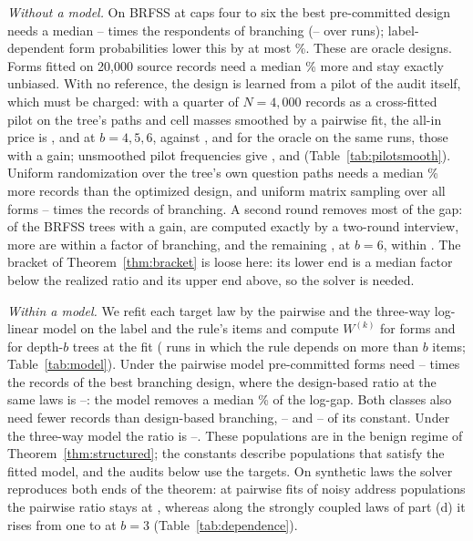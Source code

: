 \emph{Without a model.} On BRFSS at caps four to six the best pre-committed design needs a median \nScreenBestLo--\nScreenBestHi{} times the respondents of branching (\nScreenRunLo--\nScreenRunHi{} over runs); label-dependent form probabilities lower this by at most \nLabelMax\%. These are oracle designs. Forms fitted on 20,000 source records need a median \nFitMed\% more and stay exactly unbiased. With no reference, the design is learned from a pilot of the audit itself, which must be charged: with a quarter of $N=4{,}000$ records as a cross-fitted pilot on the tree's paths and cell masses smoothed by a pairwise fit, the all-in price is \nSmoothFourc, \nSmoothFivec{} and \nSmoothSixc{} at $b=4,5,6$, against \nSmoothFourBest, \nSmoothFiveBest{} and \nSmoothSixBest{} for the oracle on the same runs, those with a gain; unsmoothed pilot frequencies give \nSmoothEmpFourc, \nSmoothEmpFivec{} and \nSmoothEmpSixc{} (Table~\ref{tab:pilotsmooth}). Uniform randomization over the tree's own question paths needs a median \nUpsOverMed\% more records than the optimized design, and uniform matrix sampling over all forms \nUnifLo--\nUnifHi{} times the records of branching. A second round removes most of the gap: of the \nScreenGainN{} BRFSS trees with a gain, \nGainComputable{} are computed exactly by a two-round interview, \nGainExactNon{} more are within a factor \nScreenTwoMax{} of branching, and the remaining \nTwoBounded, at $b=6$, within \nTwoBoundMax. The bracket of Theorem~\ref{thm:bracket} is loose here: its lower end is a median factor \nLowUnder{} below the realized ratio and its upper end \nNpOver{} above, so the solver is needed.

\emph{Within a model.} We refit each target law by the pairwise and the three-way log-linear model on the label and the rule's items and compute $W^{(k)}$ for forms and for depth-$b$ trees at the fit (\nModelRuns{} runs in which the rule depends on more than $b$ items; Table~\ref{tab:model}). Under the pairwise model pre-committed forms need \nModelTwoLo--\nModelTwoHi{} times the records of the best branching design, where the design-based ratio at the same laws is \nModelDesignLo--\nModelDesignHi: the model removes a median \nModelTwoRemoved\% of the log-gap. Both classes also need fewer records than design-based branching, \nModelTwoFixLo--\nModelTwoFixHi{} and \nModelTwoBrLo--\nModelTwoBrHi{} of its constant. Under the three-way model the ratio is \nModelThreeLo--\nModelThreeHi. These populations are in the benign regime of Theorem~\ref{thm:structured}; the constants describe populations that satisfy the fitted model, and the audits below use the targets. On synthetic laws the solver reproduces both ends of the theorem: at pairwise fits of noisy address populations the pairwise ratio stays at \nDepFitTwoMax, whereas along the strongly coupled laws of part (d) it rises from one to \nDepRatioLast{} at $b=3$ (Table~\ref{tab:dependence}).

